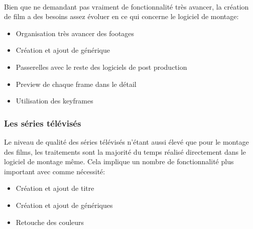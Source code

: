       \paragraph{}
        Bien que ne demandant pas vraiment de fonctionnalité très avancer, la création
        de film a des besoins assez évoluer en ce qui concerne le logiciel de montage:
        \begin{itemize}
          \item{Organisation très avancer des footages}
          \item{Création et ajout de générique}
          \item{Passerelles avec le reste des logiciels de post production}
          \item{Preview de chaque frame dans le détail}
          \item{Utilisation des keyframes}
        \end{itemize}


    \subsubsection {Les séries télévisés}
      Le niveau de qualité des séries télévisés n'étant aussi élevé que pour
      le montage des films, les traitements sont la majorité du temps réalisé
      directement dans le logiciel de montage même. Cela implique un nombre de
      fonctionnalité plus important avec comme nécessité:
      \begin{itemize}
        \item{Création et ajout de titre}
        \item{Création et ajout de génériques}
        \item{Retouche des couleurs}
      \end{itemize}

